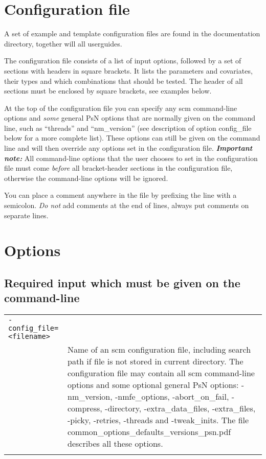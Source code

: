 \documentclass[a4paper,12pt]{article}
\begin{document}
\section{Configuration file}
A set of example and template configuration files are found in the documentation directory, together will all userguides.

The configuration file consists of a list of input options, followed by a set of sections with headers in square brackets. It lists the parameters and covariates, their types and which combinations that should be tested. The header of all sections must be enclosed by square brackets, see examples below. 

At the top of the configuration file you can specify any scm command-line options and \emph{some} general PsN options that are normally given on the command line, such as “threads” and “nm\_version” (see description of option config\_file below for a more complete list). These options can still be given on the command line and will then override any options set in the configuration file. \emph{\textbf{Important note:}} All command-line options that the user chooses to set in the configuration file must come \emph{before} all bracket-header sections in the configuration file, otherwise the command-line options will be ignored.

You can place a comment anywhere in the file by prefixing the line with a semicolon. \emph{Do not} add comments at the end of lines, always put comments on separate lines.

\section{Options}
\subsection{Required input which must be given on the command-line}

\begin{longtable}{p{1in}p{4in}}
\verb|-config_file=<filename>| & \\
\nopagebreak
 & Name of an scm configuration file, including search path if file is not stored in current directory. The configuration file may contain all scm command-line options and some optional general PsN options: \mbox{-nm\_version}, \mbox{-nmfe\_options}, \mbox{-abort\_on\_fail}, \mbox{-compress}, \mbox{-directory}, \mbox{-extra\_data\_files}, \mbox{-extra\_files}, \mbox{-picky}, \mbox{-retries}, \mbox{-threads} and \mbox{-tweak\_inits}. The file common\_options\_defaults\_versions\_psn.pdf describes all these options. \\
 \\
\end{longtable}
\end{document}
